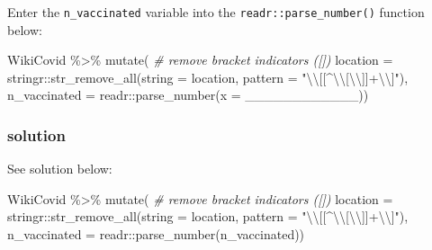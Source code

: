 \documentclass[11pt,]{article}
\newenvironment{Shaded}{\begin{snugshade}}{\end{snugshade}}
\newcommand{\AttributeTok}[1]{\textcolor[rgb]{0.77,0.63,0.00}{#1}}
\newcommand{\CommentTok}[1]{\textcolor[rgb]{0.56,0.35,0.01}{\textit{#1}}}
\newcommand{\FunctionTok}[1]{\textcolor[rgb]{0.00,0.00,0.00}{#1}}
\newcommand{\NormalTok}[1]{#1}
\newcommand{\SpecialCharTok}[1]{\textcolor[rgb]{0.00,0.00,0.00}{#1}}
\newcommand{\StringTok}[1]{\textcolor[rgb]{0.31,0.60,0.02}{#1}}
\let\oldShaded\Shaded
\let\endoldShaded\endShaded
\renewenvironment{Shaded}{\footnotesize\oldShaded}{\endoldShaded}
\begin{document}
Enter the \texttt{n\_vaccinated} variable into the
\texttt{readr::parse\_number()} function below:

\begin{Shaded}
\begin{Highlighting}[]
\NormalTok{WikiCovid }\SpecialCharTok{\%\textgreater{}\%}
  \FunctionTok{mutate}\NormalTok{(}
    \CommentTok{\# remove bracket indicators ([])}
    \AttributeTok{location =}\NormalTok{ stringr}\SpecialCharTok{::}\FunctionTok{str\_remove\_all}\NormalTok{(}\AttributeTok{string =}\NormalTok{ location, }
                                       \AttributeTok{pattern =} \StringTok{"}\SpecialCharTok{\textbackslash{}\textbackslash{}}\StringTok{[[\^{}}\SpecialCharTok{\textbackslash{}\textbackslash{}}\StringTok{[}\SpecialCharTok{\textbackslash{}\textbackslash{}}\StringTok{]]+}\SpecialCharTok{\textbackslash{}\textbackslash{}}\StringTok{]"}\NormalTok{), }
    \AttributeTok{n\_vaccinated =}\NormalTok{ readr}\SpecialCharTok{::}\FunctionTok{parse\_number}\NormalTok{(}\AttributeTok{x =}\NormalTok{ \_\_\_\_\_\_\_\_\_\_\_\_))}
\end{Highlighting}
\end{Shaded}

\hypertarget{solution-4}{%
\subsubsection{solution}\label{solution-4}}

See solution below:

\begin{Shaded}
\begin{Highlighting}[]
\NormalTok{WikiCovid }\SpecialCharTok{\%\textgreater{}\%}
  \FunctionTok{mutate}\NormalTok{(}
    \CommentTok{\# remove bracket indicators ([])}
    \AttributeTok{location =}\NormalTok{ stringr}\SpecialCharTok{::}\FunctionTok{str\_remove\_all}\NormalTok{(}\AttributeTok{string =}\NormalTok{ location, }
                                       \AttributeTok{pattern =} \StringTok{"}\SpecialCharTok{\textbackslash{}\textbackslash{}}\StringTok{[[\^{}}\SpecialCharTok{\textbackslash{}\textbackslash{}}\StringTok{[}\SpecialCharTok{\textbackslash{}\textbackslash{}}\StringTok{]]+}\SpecialCharTok{\textbackslash{}\textbackslash{}}\StringTok{]"}\NormalTok{), }
    \AttributeTok{n\_vaccinated =}\NormalTok{ readr}\SpecialCharTok{::}\FunctionTok{parse\_number}\NormalTok{(n\_vaccinated))}
\end{Highlighting}
\end{Shaded}
\end{document}

